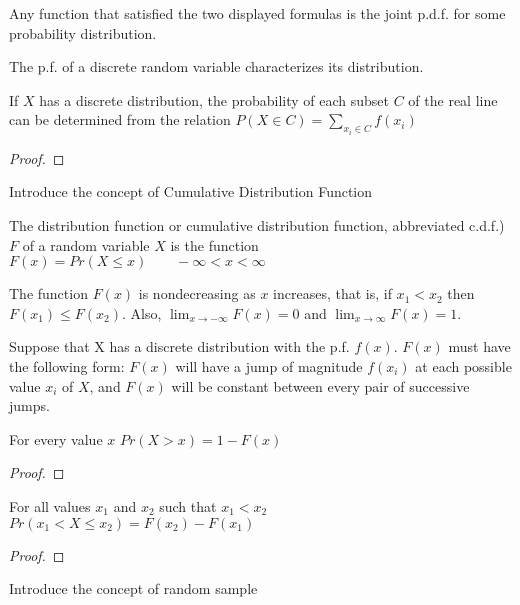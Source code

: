 {\color{red} Any function that satisfied the two displayed formulas is the joint p.d.f. for some probability distribution.}

{\color{red} The p.f. of a discrete random variable characterizes its distribution.}

\begin{proposition}
If $X$ has a discrete distribution, the probability of each subset $C$ of the real line can be determined from the relation $P\left(X\in C\right)=\sum_{x_{i}\in C}f\left(x_{i}\right)$
\end{proposition}
\begin{proof}
\end{proof}

{\color{red} Introduce the concept of Cumulative Distribution Function}

\begin{definition}
The distribution function or cumulative distribution function, abbreviated c.d.f.) $F$ of a random variable $X$ is the function $F(x)=Pr(X\leq x)\qquad-\infty<x<\infty$
\end{definition}

{\color{red}
The function $F\left(x\right)$ is nondecreasing as $x$ increases, that is, if $x_{1}<x_{2}$ then $F\left(x_{1}\right)\leq F\left(x_{2}\right)$. Also, $\lim_{x\rightarrow-\infty}F\left(x\right)=0$ and $\lim_{x\rightarrow\infty}F\left(x\right)=1$.
}

{\color{red}
Suppose that X has a discrete distribution with the p.f. $f\left(x\right)$. $F\left(x\right)$ must have the following form: $F\left(x\right)$ will have a jump of magnitude $f\left(x_{i}\right)$ at each possible value $x_{i}$ of $X$, and $F\left(x\right)$ will be constant between every pair of successive jumps.
}

\begin{proposition}
For every value $x$ $Pr\left(X>x\right)=1-F\left(x\right)$
\end{proposition}
\begin{proof}
\end{proof}

\begin{proposition}
For all values $x_{1}$ and $x_{2}$ such that $x_{\text{1}}<x_{2}$ $Pr\left(x_{1}<X\leq x_{2}\right)=F\left(x_{2}\right)-F\left(x_{1}\right)$
\end{proposition}
 \begin{proof}
\end{proof}

{\color{red} Introduce the concept of random sample}

